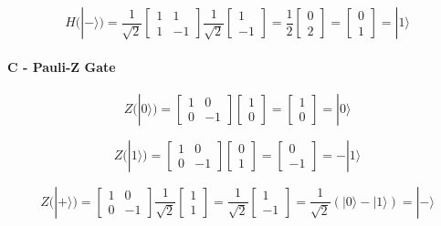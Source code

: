 \documentclass[12pt]{article}
\begin{document}
$$ H(|-⟩) = \frac{1}{\sqrt{2}} \begin{bmatrix} 1 & 1 \\ 1 & -1 \end{bmatrix} \frac{1}{\sqrt{2}} \begin{bmatrix} 1 \\ -1 \end{bmatrix} = \frac{1}{2} \begin{bmatrix} 0 \\ 2 \end{bmatrix} = \begin{bmatrix} 0 \\ 1 \end{bmatrix} = |1⟩ $$

\paragraph*{C - Pauli-Z Gate}

$$ Z(|0⟩) = \begin{bmatrix} 1 & 0 \\ 0 & -1 \end{bmatrix} \begin{bmatrix} 1 \\ 0 \end{bmatrix} = \begin{bmatrix} 1 \\ 0 \end{bmatrix} = |0⟩ $$

$$ Z(|1⟩) = \begin{bmatrix} 1 & 0 \\ 0 & -1 \end{bmatrix} \begin{bmatrix} 0 \\ 1 \end{bmatrix} = \begin{bmatrix} 0 \\ -1 \end{bmatrix} = -|1⟩ $$

$$ Z(|+⟩) = \begin{bmatrix} 1 & 0 \\ 0 & -1 \end{bmatrix} \frac{1}{\sqrt{2}} \begin{bmatrix} 1 \\ 1 \end{bmatrix} = \frac{1}{\sqrt{2}} \begin{bmatrix} 1 \\ -1 \end{bmatrix} = \frac{1}{\sqrt{2}} (|0⟩ - |1⟩) = |-⟩ $$
\end{document}
